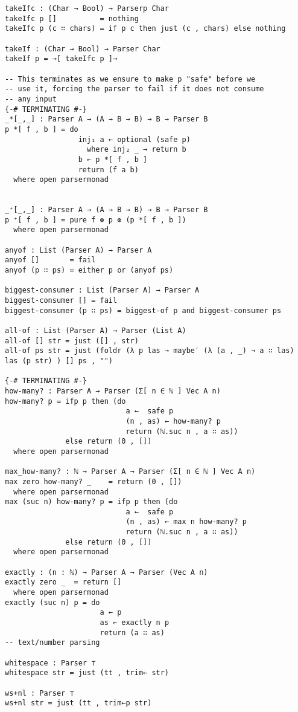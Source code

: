 \begin{appendices}
\begin{verbatim}
takeIfc : (Char → Bool) → Parserp Char
takeIfc p []          = nothing
takeIfc p (c ∷ chars) = if p c then just (c , chars) else nothing

takeIf : (Char → Bool) → Parser Char
takeIf p = →[ takeIfc p ]→

-- This terminates as we ensure to make p "safe" before we
-- use it, forcing the parser to fail if it does not consume
-- any input
{-# TERMINATING #-}
_*[_,_] : Parser A → (A → B → B) → B → Parser B
p *[ f , b ] = do
                 inj₁ a ← optional (safe p)
                   where inj₂ _ → return b
                 b ← p *[ f , b ] 
                 return (f a b)
  where open parsermonad


_⁺[_,_] : Parser A → (A → B → B) → B → Parser B
p ⁺[ f , b ] = pure f ⊛ p ⊛ (p *[ f , b ])
  where open parsermonad

anyof : List (Parser A) → Parser A
anyof []       = fail
anyof (p ∷ ps) = either p or (anyof ps)

biggest-consumer : List (Parser A) → Parser A
biggest-consumer [] = fail
biggest-consumer (p ∷ ps) = biggest-of p and biggest-consumer ps

all-of : List (Parser A) → Parser (List A)
all-of [] str = just ([] , str)
all-of ps str = just (foldr (λ p las → maybe′ (λ (a , _) → a ∷ las) las (p str) ) [] ps , "")

{-# TERMINATING #-}
how-many? : Parser A → Parser (Σ[ n ∈ ℕ ] Vec A n)
how-many? p = ifp p then (do
                            a ←  safe p
                            (n , as) ← how-many? p
                            return (ℕ.suc n , a ∷ as))
              else return (0 , [])
  where open parsermonad

max_how-many? : ℕ → Parser A → Parser (Σ[ n ∈ ℕ ] Vec A n)
max zero how-many? _    = return (0 , [])
  where open parsermonad
max (suc n) how-many? p = ifp p then (do
                            a ←  safe p
                            (n , as) ← max n how-many? p
                            return (ℕ.suc n , a ∷ as))
              else return (0 , [])
  where open parsermonad

exactly : (n : ℕ) → Parser A → Parser (Vec A n)
exactly zero _  = return []
  where open parsermonad
exactly (suc n) p = do
                      a ← p
                      as ← exactly n p
                      return (a ∷ as)
-- text/number parsing

whitespace : Parser ⊤
whitespace str = just (tt , trim← str)

ws+nl : Parser ⊤
ws+nl str = just (tt , trim←p str)


\end{verbatim}
\end{appendices}
